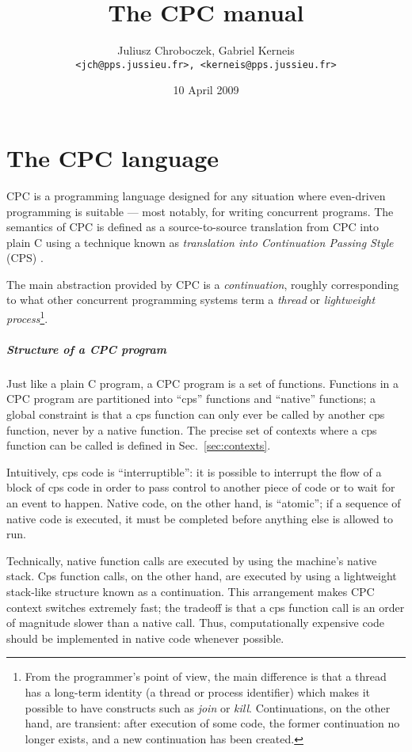 \documentclass[a4paper]{report}
\title{The CPC manual}
\author{Juliusz Chroboczek, Gabriel Kerneis\\
{\tt <jch@pps.jussieu.fr>, <kerneis@pps.jussieu.fr>}}
\date{10 April 2009}
\begin{document}
\maketitle

\chapter{The CPC language} \label{chapter:language}

CPC is a programming language designed for any situation where
even-driven programming is suitable --- most notably, for writing
concurrent programs.  The semantics of CPC is defined as a
source-to-source translation from CPC into plain C using a
technique known as {\em translation into Continuation Passing Style\/}
(CPS) \cite{strachey:continuations, plotkin:call-by-lambda}.

The main abstraction provided by CPC is a {\em continuation}, roughly
corresponding to what other concurrent programming systems term a {\em
thread\/} or {\em lightweight process\/}\footnote{From the
programmer's point of view, the main difference is that a thread has
a long-term identity (a thread or process identifier) which makes it
possible to have constructs such as {\em join\/} or {\em kill}.
Continuations, on the other hand, are transient: after execution of
some code, the former continuation no longer exists, and a new
continuation has been created.}.

\paragraph{Structure of a CPC program}

Just like a plain C program, a CPC program is a set of functions.
Functions in a CPC program are partitioned into ``cps'' functions and
``native'' functions; a global constraint is that a cps function can
only ever be called by another cps function, never by a native
function.  The precise set of contexts where a cps function can be
called is defined in Sec.~\ref{sec:contexts}.

Intuitively, cps code is ``interruptible'': it is possible to
interrupt the flow of a block of cps code in order to pass control to
another piece of code or to wait for an event to happen.  Native code,
on the other hand, is ``atomic''; if a sequence of native code is
executed, it must be completed before anything else is allowed to run.

Technically, native function calls are executed by using the machine's
native stack.  Cps function calls, on the other hand, are executed by
using a lightweight stack-like structure known as a continuation.
This arrangement makes CPC context switches extremely fast; the
tradeoff is that a cps function call is an order of magnitude slower
than a native call.  Thus, computationally expensive code should be
implemented in native code whenever possible.
\end{document}
